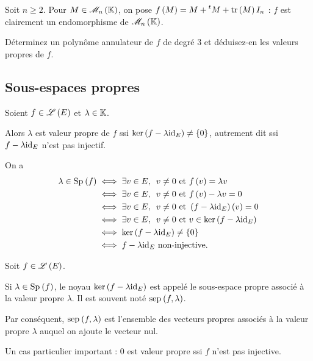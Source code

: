 \begin{exo}
Soit \(n\geq2\). Pour \(M\in\M{n}\), on pose \(f\left(M\right)=M+\prescript{t}{}{M}+\operatorname{tr}\left(M\right)I_n\) : \(f\) est clairement un endomorphisme de \(\M{n}\).

Déterminez un polynôme annulateur de \(f\) de degré \(3\) et déduisez-en les valeurs propres de \(f\).
\end{exo}

\subsection{Sous-espaces propres}

\begin{prop}
Soient \(f\in\mathscr{L}\left(E\right)\) et \(\lambda\in\mathbb{K}\).

Alors \(\lambda\) est valeur propre de \(f\) ssi \(\ker\left(f-\lambda\mathrm{id}_{E}\right)\not=\left\lbrace0\right\rbrace\), autrement dit ssi \(f-\lambda\mathrm{id}_{E}\) n'est pas injectif.
\end{prop}

\begin{dem}
On a \[\begin{aligned}
\lambda\in\Sp{f}&\ssi\quantifs{\exists v\in E}v\not=0\text{ et }f\paren{v}=\lambda v \\
&\ssi\quantifs{\exists v\in E}v\not=0\text{ et }f\paren{v}-\lambda v=0 \\
&\ssi\quantifs{\exists v\in E}v\not=0\text{ et }\paren{f-\lambda\id{E}}\paren{v}=0 \\
&\ssi\quantifs{\exists v\in E}v\not=0\text{ et }v\in\ker\paren{f-\lambda\id{E}} \\
&\ssi\ker\paren{f-\lambda\id{E}}\not=\accol{0} \\
&\ssi f-\lambda\id{E}\text{ non-injective}.
\end{aligned}\]
\end{dem}

\begin{defi}
Soit \(f\in\mathscr{L}\left(E\right)\).

Si \(\lambda\in\Sp{f}\), le noyau \(\ker\left(f-\lambda\mathrm{id}_{E}\right)\) est appelé le sous-espace propre associé à la valeur propre \(\lambda\). Il est souvent noté \(\sep{f}{\lambda}\).
\end{defi}

Par conséquent, \(\sep{f}{\lambda}\) est l'ensemble des vecteurs propres associés à la valeur propre \(\lambda\) auquel on ajoute le vecteur nul.

\begin{rem}
Un cas particulier important : \(0\) est valeur propre ssi \(f\) n'est pas injective.
\end{rem}

